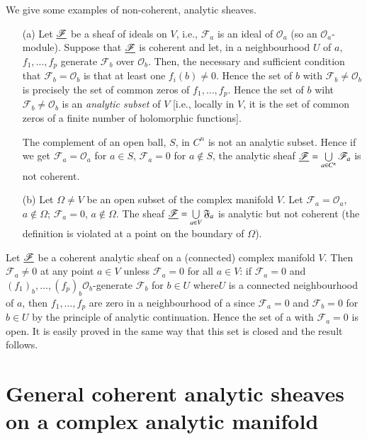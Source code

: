 We give some examples of non-coherent, analytic sheaves. 
\begin{itemize}
\item[(a)] Let $\underline{\mathscr{F}}$ be a sheaf of ideals on $V$, i.e.,
  $\mathscr{F}_a$ is an ideal of $\mathscr{O}_a$ (so an
  $\mathscr{O}_a$-module). Suppose that $\underline{\mathscr{F}}$ is coherent
  and let, in a neighbourhood $U$ of $a$, $f_1, \ldots, f_p$ generate
  $\mathscr{F}_b$ over $\mathscr{O}_b$. Then, the necessary and
  sufficient condition that $\mathscr{F}_b = \mathscr{O}_b$ is that at
  least one $f_i(b) \neq 0$. Hence the set of $b$ with $\mathscr{F}_b
  \neq \mathscr{O}_b$ is precisely the set of common zeros of $f_1,
  \ldots, f_p$. Hence the set of $b$ wiht $\mathscr{F}_b \neq
  \mathscr{O}_b$ is an \textit{analytic subset} of $V$ [i.e., locally
    in $V$, it is the set of common zeros of a finite number of
    holomorphic functions].

The complement of an open ball, $S$, in $C^n$ is not an analytic
subset. Hence if we get $\mathscr{F}_a = \mathscr{O}_a$ for $a \in S$,
$\mathscr{F}_a = 0$ for $a \notin S$, the analytic sheaf
$\underline{\mathscr{F}} = \bigcup\limits_{a \in C^n} \mathscr{F}_a$ is not
coherent. 

\item[(b)] Let $\Omega \neq V$ be an open subset of the complex
  manifold $V$. Let $\mathscr{F}_a = \mathscr{O}_a$, $a \notin\Omega$;
  $\mathscr{F}_a = 0$, $a \notin \Omega$. The sheaf $\underline{\mathscr{F}}
  = \bigcup\limits_{a \in V} \mathfrak{F}_a$ is analytic but not
  coherent (the definition is violated at a point on the boundary of
  $\Omega$). 
\end{itemize}

Let $\underline{\mathscr{F}}$ be a coherent analytic sheaf on a (connected)
complex manifold $V$. Then $\mathscr{F}_a \neq 0$ at any point $a \in
V$ unless $\mathscr{F}_a = 0$ for all $a \in V$: if $\mathscr{F}_a =
0$ and $(f_1)_b, \ldots, (f_p)_b \mathscr{O}_b$-generate
$\mathscr{F}_b$ for $b \in U$ where\pageoriginale $U$ is a connected
neighbourhood of $a$, then $f_1, \ldots, f_p$ are zero in a
neighbourhood of a since $\mathscr{F}_ a= 0$ and $\mathscr{F}_b = 0$
for $b \in U$ by the principle of analytic continuation. Hence the set
of a with $\mathscr{F}_a = 0$ is open. It is easily proved in the same
way that this set is closed and the result follows. 

\section[General coherent analytic sheaves on a...]{General coherent
  analytic sheaves on a complex analytic 
  manifold}\label{chap12:sec3}

